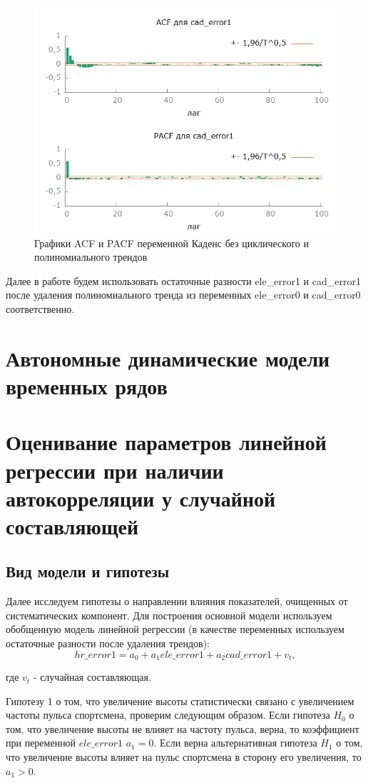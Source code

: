 \documentclass[a4paper,12pt]{article}
\begin{document}
\begin{figure}[H]
	\centering
	\includegraphics[width=0.5\linewidth]{../[graphics]/cad_error1_acf_100.png}
	\caption{Графики ACF и PACF переменной Каденс без циклического и полиномиального трендов}
	\label{fig:cad_error1_acf_100}
\end{figure}

Далее в работе будем использовать остаточные разности ele\_error1 и cad\_error1 после удаления полиномиального тренда из переменных ele\_error0 и cad\_error0 соответственно.

\section{Автономные динамические модели временных рядов}



\section{Оценивание параметров линейной регрессии при наличии автокорреляции у случайной составляющей}

\subsection{Вид модели и гипотезы}
Далее исследуем гипотезы о направлении влияния показателей, очищенных от систематических компонент. Для построения основной модели используем обобщенную модель линейной регрессии (в качестве переменных используем остаточные разности после удаления трендов):
\[hr\_error1 = a_0 + a_1 ele\_error1 + a_2 cad\_error1 + v_t,\]

где $v_t$ - случайная составляющая.

Гипотезу 1 о том, что увеличение высоты статистически связано с увеличением частоты пульса спортсмена, проверим следующим образом. Если гипотеза $H_0$ о том, что увеличение высоты не влияет на частоту пульса, верна, то коэффициент при переменной $ele\_error1$ $a_1 = 0$. Если верна альтернативная гипотеза $H_1$ о том, что увеличение высоты влияет на пульс спортсмена в сторону его увеличения, то $a_1 > 0$.
\end{document}
